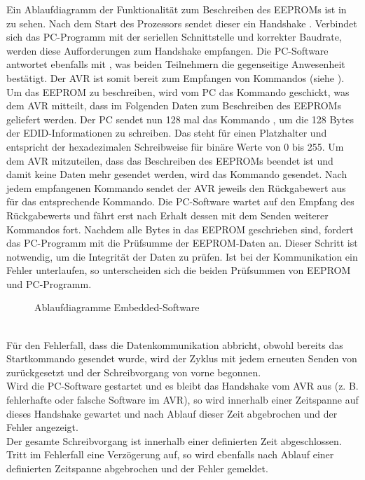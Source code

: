 Ein Ablaufdiagramm der Funktionalität zum Beschreiben des EEPROMs ist in  zu sehen. Nach dem Start des Prozessors sendet dieser ein Handshake . Verbindet sich das PC-Programm mit der seriellen Schnittstelle und korrekter Baudrate, werden diese Aufforderungen zum Handshake empfangen. Die PC-Software antwortet ebenfalls mit , was beiden Teilnehmern die gegenseitige Anwesenheit bestätigt. Der AVR ist somit bereit zum Empfangen von Kommandos (siehe ). Um das EEPROM zu beschreiben, wird vom PC das Kommando  geschickt, was dem AVR mitteilt, dass im Folgenden Daten zum Beschreiben des EEPROMs geliefert werden. Der PC sendet nun 128 mal das Kommando , um die 128 Bytes der EDID-Informationen zu schreiben. Das  steht für einen Platzhalter und entspricht der hexadezimalen Schreibweise für binäre Werte von 0 bis 255. Um dem AVR mitzuteilen, dass das Beschreiben des EEPROMs beendet ist und damit keine Daten mehr gesendet werden, wird das Kommando  gesendet. Nach jedem empfangenen Kommando sendet der AVR jeweils den Rückgabewert aus  für das entsprechende Kommando. Die PC-Software wartet auf den Empfang des Rückgabewerts und fährt erst nach Erhalt dessen mit dem Senden weiterer Kommandos fort. Nachdem alle Bytes in das EEPROM geschrieben sind, fordert das PC-Programm mit  die Prüfsumme der EEPROM-Daten an. Dieser Schritt ist notwendig, um die Integrität der Daten zu prüfen. Ist bei der Kommunikation ein Fehler unterlaufen, so unterscheiden sich die beiden Prüfsummen von EEPROM und PC-Programm.\\
\begin{figure}[htp]
	\center
    \caption{Ablaufdiagramme Embedded-Software}
    \label{fig:ablaufdiagramm_avr} 
\end{figure}\\

Für den Fehlerfall, dass die Datenkommunikation abbricht, obwohl bereits das Startkommando  gesendet wurde, wird der Zyklus mit jedem erneuten Senden von  zurückgesetzt und der Schreibvorgang von vorne begonnen.\\
Wird die PC-Software gestartet und es bleibt das Handshake vom AVR aus (z. B. fehlerhafte oder falsche Software im AVR), so wird innerhalb einer Zeitspanne auf dieses Handshake gewartet und nach Ablauf dieser Zeit abgebrochen und der Fehler angezeigt.\\
Der gesamte Schreibvorgang ist innerhalb einer definierten Zeit abgeschlossen. Tritt im Fehlerfall eine Verzögerung auf, so wird ebenfalls nach Ablauf einer definierten Zeitspanne abgebrochen und der Fehler gemeldet.

